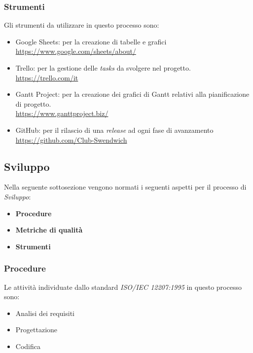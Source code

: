\subsubsection{Strumenti}
Gli strumenti da utilizzare in questo processo sono:

\begin{itemize}
    \item Google Sheets: per la creazione di tabelle e grafici \\
    \href{https://www.google.com/sheets/about/}{https://www.google.com/sheets/about/}
    \item Trello: per la gestione delle \textit{tasks} da svolgere nel progetto.\\
    \href{https://trello.com/it}{https://trello.com/it}
    \item Gantt Project: per la creazione dei grafici di Gantt relativi alla pianificazione di progetto.\\
    \href{https://www.ganttproject.biz/}{https://www.ganttproject.biz/}
    \item GitHub: per il rilascio di una \textit{release} ad ogni fase di avanzamento\\
    \href{https://github.com/Club-Swendwich}{https://github.com/Club-Swendwich}
\end{itemize}

\newpage
\subsection{Sviluppo}
Nella seguente sottosezione vengono normati i seguenti aspetti per il 
processo di \textit{Sviluppo}:
\begin{itemize}
    \item \textbf{Procedure}
    \item \textbf{Metriche di qualità}
    \item \textbf{Strumenti}
\end{itemize}

\subsubsection{Procedure}

Le attività individuate dallo standard \textit{ISO/IEC 12207:1995} in questo processo sono:
\begin{itemize}
    \item Analisi dei requisiti
    \item Progettazione
    \item Codifica
\end{itemize}

